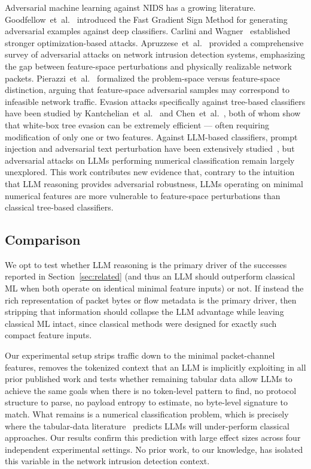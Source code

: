 \documentclass[conference]{IEEEtran}
\begin{document}
Adversarial machine learning against NIDS has a growing literature. Goodfellow~et~al.~\cite{goodfellow2015fgsm} introduced the Fast Gradient Sign Method for generating adversarial examples against deep classifiers. Carlini and Wagner~\cite{carlini2017cw} established stronger optimization-based attacks. Apruzzese~et~al.~\cite{apruzzese2020adversarial} provided a comprehensive survey of adversarial attacks on network intrusion detection systems, emphasizing the gap between feature-space perturbations and physically realizable network packets. Pierazzi~et~al.~\cite{pierazzi2020problem} formalized the problem-space versus feature-space distinction, arguing that feature-space adversarial samples may correspond to infeasible network traffic. Evasion attacks specifically against tree-based classifiers have been studied by Kantchelian~et~al.~\cite{kantchelian2016evasion} and Chen~et~al.~\cite{chen2019robust}, both of whom show that white-box tree evasion can be extremely efficient --- often requiring modification of only one or two features. Against LLM-based classifiers, prompt injection and adversarial text perturbation have been extensively studied~\cite{perez2022prompt,zou2023universal}, but adversarial attacks on LLMs performing numerical classification remain largely unexplored. This work contributes new evidence that, contrary to the intuition that LLM reasoning provides adversarial robustness, LLMs operating on minimal numerical features are more vulnerable to feature-space perturbations than classical tree-based classifiers.

\subsection{Comparison}

We opt to test whether LLM reasoning is the primary driver of the successes reported in Section~\ref{sec:related} (and thus an LLM should outperform classical ML when both operate on identical minimal feature inputs) or not. If instead the rich representation of packet bytes or flow metadata is the primary driver, then stripping that information should collapse the LLM advantage while leaving classical ML intact, since classical methods were designed for exactly such compact feature inputs. 

Our experimental setup strips traffic down to the minimal packet-channel features, removes the tokenized context that an LLM is implicitly exploiting in all prior published work and tests whether remaining tabular data allow LLMs to achieve the same goals when there is no token-level pattern to find, no protocol structure to parse, no payload entropy to estimate, no byte-level signature to match. What remains is a numerical classification problem, which is precisely where the tabular-data literature~\cite{hegselmann2023tabllm,fang2024large, wang2024tabletime} predicts LLMs will under-perform classical approaches. Our results confirm this prediction with large effect sizes across four independent experimental settings. No prior work, to our knowledge, has isolated this variable in the network intrusion detection context.
\end{document}
